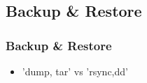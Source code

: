 \documentclass[hyperref={pdfpagelabels=false}]{beamer}
\begin{document}
    \subsection{Backup \& Restore}
	    \begin{frame}
			\frametitle{Backup \& Restore}
			\begin{itemize}
                \item<2-> 'dump, tar' vs 'rsync,dd'
            \end{itemize}
		\end{frame}
\end{document}
